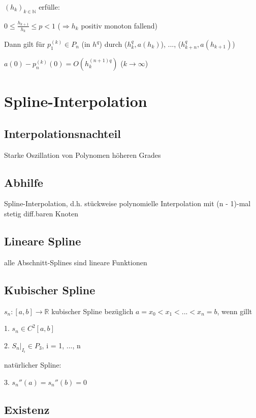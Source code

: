 \documentclass[12pt,a4paper]{article} %
\newcommand*\tab[1][1cm]{\hspace*{#1}}
\begin{document}
	$(h_k)_{k \in \mathbb{N}}$ erfülle:
	
	$0 \le \frac{h_{k + 1}}{h_k} \le p < 1$ ($\Rightarrow h_k$ positiv monoton fallend)
	
	Dann gilt für $p_1^{(k)} \in P_n$ (in $h^q$) durch ($h_k^q, a(h_k)$), ..., ($h_{k +n}^q, a(h_{k + 1})$)
	
	$a(0) - p_n^{(k)}(0) = O(h_k^{(n + 1)q})$ \tab ($k \rightarrow \infty$)
	
	\newpage
	
	\section{Spline-Interpolation}
	
	\subsection{Interpolationsnachteil}
	
	Starke Oszillation von Polynomen höheren Grades
	
	\subsection{Abhilfe}
	
	Spline-Interpolation, d.h. stückweise polynomielle Interpolation mit (n - 1)-mal stetig diff.baren Knoten
	
	\subsection{Lineare Spline}
	
	alle Abschnitt-Splines sind lineare Funktionen
	
	\subsection{Kubischer Spline}
	
	$s_n: [a, b] \rightarrow \mathbb{R}$ kubischer Spline bezüglich $a = x_0 < x_1 < ... < x_n = b$, wenn gillt
	
	1. $s_n \in C^2[a, b]$
	
	2. $S_n|_{I_i} \in P_3$, i = 1, ..., n
	
	natürlicher Spline:
	
	3. $s_n''(a) = s_n''(b) = 0$
	
	\subsection{Existenz}
	
\end{document}
